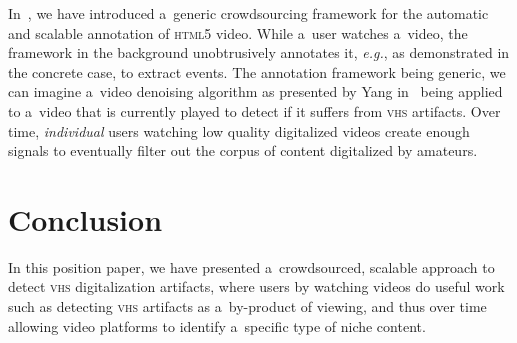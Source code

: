 \documentclass[runningheads,a4paper]{llncs}
\begin{document}
In~\cite{steiner2011crowdsourcing}, we have introduced
a~generic crowdsourcing framework for the automatic and scalable
annotation of {\scshape html5} video.
While a~user watches a~video, the framework in the background
unobtrusively annotates it, \emph{e.g.}, as demonstrated
in the concrete case, to extract events.
The annotation framework being generic,
we can imagine a~video denoising algorithm
as presented by Yang in~\cite{yang2009videonoise}
being applied to a~video that is currently played
to detect if it suffers from {\scshape vhs} artifacts.
Over time, \emph{individual} users watching low quality digitalized videos
create enough signals to eventually filter out the corpus of
content digitalized by amateurs.

\vspace{-1em}
\section{Conclusion}
\vspace{-0.9em}

In this position paper, we have presented a~crowdsourced,
scalable approach to detect {\scshape vhs} digitalization artifacts,
where users by watching videos do useful work such as
detecting {\scshape vhs} artifacts as a~by-product of viewing,
and thus over time allowing video platforms to identify
a~specific type of niche content.

\vspace{-1.3em}

\footnotesize

\renewcommand\refname{}
\vspace{-2em}

\end{document}
